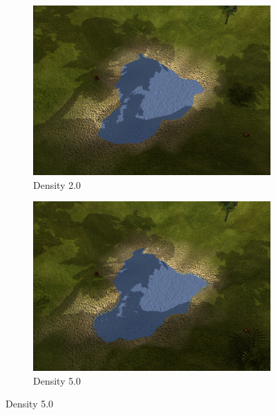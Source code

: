 \begin{figure}[H]
\begin{subfigure}{.5\textwidth}
  \centering
  \includegraphics[width=0.9\linewidth]{images/terrainDensityComparison1_2.jpg}
  \caption{Density 2.0}
  \label{fig:textureDensity2}
\end{subfigure}%
\begin{subfigure}{.5\textwidth}
  \centering
  \includegraphics[width=0.9\linewidth]{images/terrainDensityComparison1_5.jpg}
  \caption{Density 5.0}
  \label{fig:textureDensity5}
\end{subfigure}%


\end{figure}
